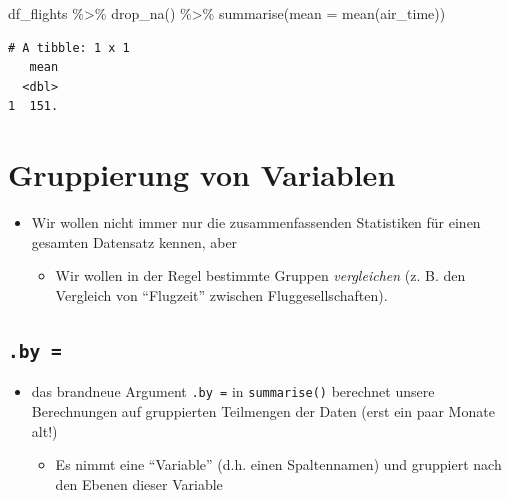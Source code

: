 \documentclass[
  letterpaper,
  DIV=11]{scrartcl}
\newenvironment{Shaded}{\begin{snugshade}}{\end{snugshade}}
\newcommand{\AttributeTok}[1]{\textcolor[rgb]{0.40,0.45,0.13}{#1}}
\newcommand{\FunctionTok}[1]{\textcolor[rgb]{0.28,0.35,0.67}{#1}}
\newcommand{\NormalTok}[1]{\textcolor[rgb]{0.00,0.23,0.31}{#1}}
\newcommand{\SpecialCharTok}[1]{\textcolor[rgb]{0.37,0.37,0.37}{#1}}
\providecommand{\tightlist}{%
  \setlength{\itemsep}{0pt}\setlength{\parskip}{0pt}}\usepackage{longtable,booktabs,array}
\begin{document}
\begin{Shaded}
\begin{Highlighting}[]
\NormalTok{df\_flights }\SpecialCharTok{\%\textgreater{}\%} 
  \FunctionTok{drop\_na}\NormalTok{() }\SpecialCharTok{\%\textgreater{}\%} 
  \FunctionTok{summarise}\NormalTok{(}\AttributeTok{mean =} \FunctionTok{mean}\NormalTok{(air\_time))}
\end{Highlighting}
\end{Shaded}

\begin{verbatim}
# A tibble: 1 x 1
   mean
  <dbl>
1  151.
\end{verbatim}

\hypertarget{gruppierung-von-variablen}{%
\section{Gruppierung von Variablen}\label{gruppierung-von-variablen}}

\begin{itemize}
\tightlist
\item
  Wir wollen nicht immer nur die zusammenfassenden Statistiken für einen
  gesamten Datensatz kennen, aber

  \begin{itemize}
  \tightlist
  \item
    Wir wollen in der Regel bestimmte Gruppen \emph{vergleichen} (z. B.
    den Vergleich von ``Flugzeit'' zwischen Fluggesellschaften).
  \end{itemize}
\end{itemize}

\hypertarget{by}{%
\subsection{\texorpdfstring{\texttt{.by\ =}}{.by =}}\label{by}}

\begin{itemize}
\tightlist
\item
  das brandneue Argument \texttt{.by\ =} in \texttt{summarise()}
  berechnet unsere Berechnungen auf gruppierten Teilmengen der Daten
  (erst ein paar Monate alt!)

  \begin{itemize}
  \tightlist
  \item
    Es nimmt eine ``Variable'' (d.h. einen Spaltennamen) und gruppiert
    nach den Ebenen dieser Variable
  \end{itemize}
\end{itemize}
\end{document}
